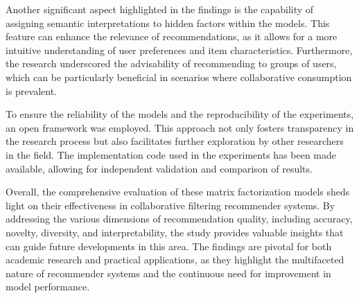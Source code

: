 \documentclass[runningheads]{llncs}
\begin{document}
Another significant aspect highlighted in the findings is the capability of assigning semantic interpretations to hidden factors within the models. This feature can enhance the relevance of recommendations, as it allows for a more intuitive understanding of user preferences and item characteristics. Furthermore, the research underscored the advisability of recommending to groups of users, which can be particularly beneficial in scenarios where collaborative consumption is prevalent.

To ensure the reliability of the models and the reproducibility of the experiments, an open framework was employed. This approach not only fosters transparency in the research process but also facilitates further exploration by other researchers in the field. The implementation code used in the experiments has been made available, allowing for independent validation and comparison of results.

Overall, the comprehensive evaluation of these matrix factorization models sheds light on their effectiveness in collaborative filtering recommender systems. By addressing the various dimensions of recommendation quality, including accuracy, novelty, diversity, and interpretability, the study provides valuable insights that can guide future developments in this area. The findings are pivotal for both academic research and practical applications, as they highlight the multifaceted nature of recommender systems and the continuous need for improvement in model performance.
\end{document}
